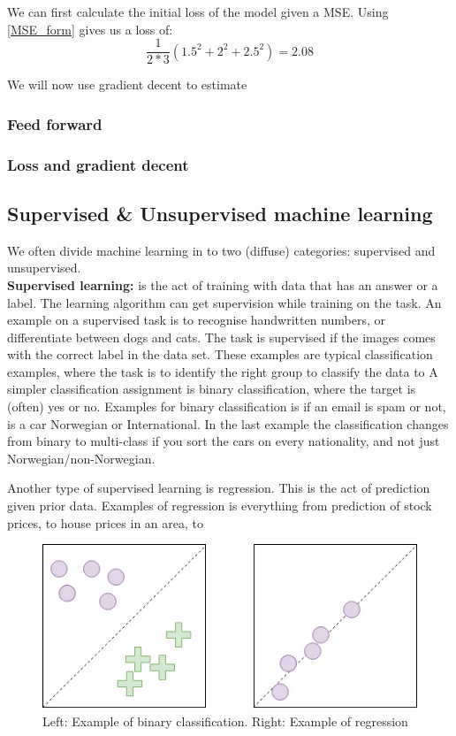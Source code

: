 	We can first calculate the initial loss of the model given a MSE. Using \ref{MSE_form} gives us a loss of:
	\begin{equation}
	   \frac{1}{2*3} (1.5^2+2^2+2.5^2)=2.08
	\end{equation}
	
	
	We will now use gradient decent to estimate
	
	
	
	
	
	\subsubsection{Feed forward}
    
	\subsubsection{Loss and gradient decent }

    
    \subsection{Supervised \& Unsupervised machine learning}
	We often divide machine learning in to two (diffuse) categories: supervised and unsupervised.\\
	\vspace{5px}
	\textbf{Supervised learning:} is the act of training with data that has an answer or a label. The learning algorithm can get supervision while 
	training on the task. An example on a supervised task  is to recognise handwritten numbers, or differentiate between dogs and cats. The task is supervised if the images
	comes with the correct label in the data set. These  examples are typical classification examples, where the task is to identify the right group to classify the data to %
	A simpler classification assignment is binary classification, where the target is (often) yes or no. Examples for binary classification is if an email is spam or not, is a car Norwegian 
	or International. 
	In the last example the classification changes from binary to multi-class if you sort the cars on every nationality, and not just Norwegian/non-Norwegian.
	  
	Another type of supervised learning is regression. This is the act of prediction given prior data. Examples of regression is everything from prediction of stock prices, to house prices 
	in an area, to\\ %
	\begin{figure}
	    \centering
	    \includegraphics[scale=0.5]{figures/class_vs_reg.png}
	    \caption{Left: Example of binary classification. Right: Example of regression} 
	\end{figure}
  
